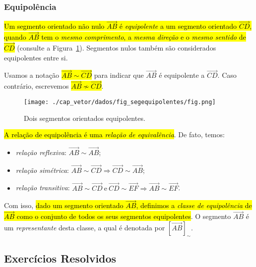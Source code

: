 \subsubsection{Equipolência}

\hl{Um segmento orientado não nulo $\overrightarrow{AB}$ é \emph{equipolente} a um segmento orientado $\overrightarrow{CD}$, quando $\overrightarrow{AB}$ tem o \emph{mesmo comprimento}, a \emph{mesma direção} e o \emph{mesmo sentido} de $\overrightarrow{CD}$} (consulte a Figura~\ref{cap_vetor_sec_segorien:fig:segequipolentes}). Segmentos nulos também são considerados equipolentes entre si. 

Usamos a notação \hl{$\overrightarrow{AB} \sim \overrightarrow{CD}$} para indicar que $\overrightarrow{AB}$ é equipolente a $\overrightarrow{CD}$. Caso contrário, escrevemos \hl{$\overrightarrow{AB} \not\sim \overrightarrow{CD}$}.

\begin{figure}[h]
  \centering
  \texttt{[image: ./cap\_vetor/dados/fig\_segequipolentes/fig.png]}
  \caption{Dois segmentos orientados equipolentes.}
  \label{cap_vetor_sec_segorien:fig:segequipolentes}
\end{figure}

\hl{A relação de equipolência é uma \emph{relação de equivalência}}. De fato, temos:
\begin{itemize}
\item \emph{relação reflexiva}: $\overrightarrow{AB} \sim \overrightarrow{AB}$;
\item \emph{relação simétrica}: $\overrightarrow{AB} \sim \overrightarrow{CD} \Rightarrow \overrightarrow{CD} \sim \overrightarrow{AB}$;
\item \emph{relação transitiva}: $\overrightarrow{AB} \sim \overrightarrow{CD} ~ \text{e} ~ \overrightarrow{CD} \sim \overrightarrow{EF} \Rightarrow \overrightarrow{AB} \sim \overrightarrow{EF}$.
\end{itemize}

Com isso, \hl{dado um segmento orientado $\overrightarrow{AB}$, definimos a \emph{classe de equipolência} de $\overrightarrow{AB}$ como o conjunto de todos os seus segmentos equipolentes}. O segmento $\overrightarrow{AB}$ é um \emph{representante} desta classe, a qual é denotada por $\left[\overrightarrow{AB}\right]_{\sim}$.

\subsection{Exercícios Resolvidos}

